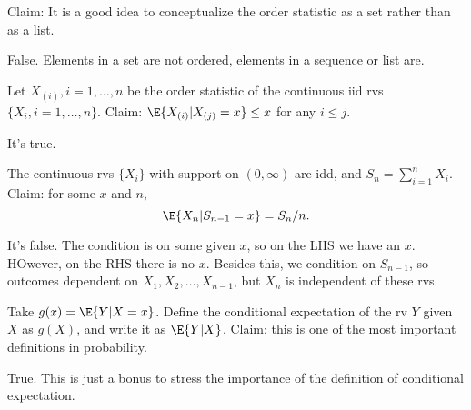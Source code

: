 \documentclass[tf-tutorial-all.tex]{subfiles}
\begin{document}
\begin{truefalse}
Claim: It is a good idea to conceptualize the order statistic as a set rather than as a list.
\begin{solution}
False. Elements in a set are not ordered, elements in a sequence or list are.
\end{solution}
\end{truefalse}

\begin{truefalse}
Let $X_{(i)}, i = 1, \ldots, n$ be the order statistic of the continuous iid rvs $\{X_{i}, i=1, \ldots, n\}$.
Claim: $\E{X_{(i)} | X_{(j)}=x} \leq x$ for any $i\leq j$.
\begin{solution}
It's true.
\end{solution}
\end{truefalse}


\begin{truefalse}
The continuous rvs $\{X_{i}\}$ with support on $(0, \infty)$ are idd, and $S_n=\sum_{i=1}^n X_{i}$.
Claim: for some $x$ and $n$,
\begin{equation}
\label{eq:6}
\E{X_{n}| S_{n-1} = x} = S_n/n.
\end{equation}
\begin{solution}
It's false.  The condition is on some given $x$, so  on the LHS we have an $x$. HOwever, on the RHS there is no $x$. Besides this, we condition on $S_{n-1}$, so outcomes dependent on $X_{1}, X_{2}, \ldots, X_{n-1}$, but $X_{n}$ is independent of these rvs.
\end{solution}
\end{truefalse}

\begin{truefalse}
Take $g(x) = \E{Y|X=x}$.
Define the conditional expectation of the rv $Y$ given $X$ as $g(X)$, and write it as $\E{Y|X}$.
Claim: this is one of the most important definitions in probability.

\begin{solution}
True. This is just a bonus to stress the importance of the definition of conditional expectation.
\end{solution}
\end{truefalse}
\end{document}
